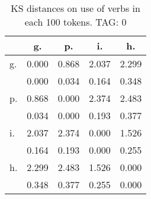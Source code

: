 \begin{table}[h!]
\begin{center}
\begin{tabular}{| l | c | c | c | c |}\hline
 & g. & p. & i. & h. \\\hline
g. & 0.000  & 0.868  & 2.037  & 2.299 \\\hline
 & 0.000  & 0.034  & 0.164  & 0.348 \\\hline
p. & 0.868  & 0.000  & 2.374  & 2.483 \\\hline
 & 0.034  & 0.000  & 0.193  & 0.377 \\\hline
i. & 2.037  & 2.374  & 0.000  & 1.526 \\\hline
 & 0.164  & 0.193  & 0.000  & 0.255 \\\hline
h. & 2.299  & 2.483  & 1.526  & 0.000 \\\hline
 & 0.348  & 0.377  & 0.255  & 0.000 \\\hline
\end{tabular}
\caption{KS distances on use of verbs in each 100 tokens. TAG: 0}
\end{center}
\end{table}